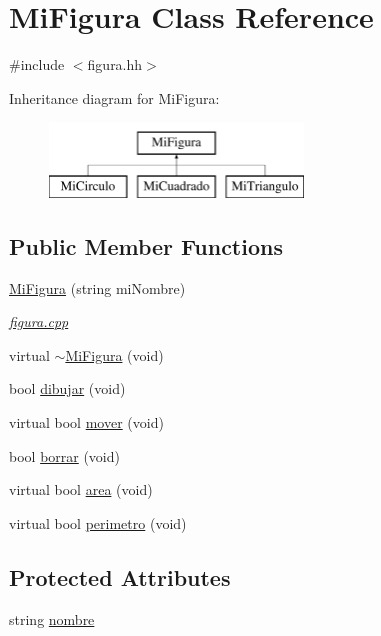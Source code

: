 \hypertarget{class_mi_figura}{\section{\-Mi\-Figura \-Class \-Reference}
\label{class_mi_figura}
}


{\ttfamily \#include $<$figura.\-hh$>$}

\-Inheritance diagram for \-Mi\-Figura\-:\begin{figure}[H]
\begin{center}
\leavevmode
\includegraphics[height=2.000000cm]{class_mi_figura}
\end{center}
\end{figure}
\subsection*{\-Public \-Member \-Functions}
\begin{DoxyCompactItemize}
\item 
\hyperlink{class_mi_figura_ae56b70317f85507263e53b89878c0f9a}{\-Mi\-Figura} (string mi\-Nombre)
\begin{DoxyCompactList}\small\item\em \hyperlink{figura_8cpp}{figura.\-cpp} \end{DoxyCompactList}\item 
virtual \hyperlink{class_mi_figura_a84c77f42e83b2ef2489de98d31d2dd94}{$\sim$\-Mi\-Figura} (void)
\item 
bool \hyperlink{class_mi_figura_ae27e391b4a1a476d5d6f1f5c8be32f7e}{dibujar} (void)
\item 
virtual bool \hyperlink{class_mi_figura_a2592d5c4828ffcd3dfefe2b4180f1450}{mover} (void)
\item 
bool \hyperlink{class_mi_figura_a216858fd3c3da657743b9757d81c24f0}{borrar} (void)
\item 
virtual bool \hyperlink{class_mi_figura_a337ca854a1149b8ed4dfbccae0b0c2d9}{area} (void)
\item 
virtual bool \hyperlink{class_mi_figura_a8878d26a1623c513fbd8afa7181a72c9}{perimetro} (void)
\end{DoxyCompactItemize}
\subsection*{\-Protected \-Attributes}
\begin{DoxyCompactItemize}
\item 
string \hyperlink{class_mi_figura_a64efa122e4549b9c86c3053a6b5627df}{nombre}
\end{DoxyCompactItemize}



